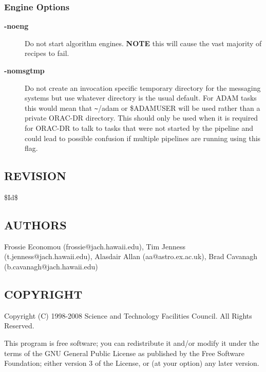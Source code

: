 \documentclass[twoside,11pt]{article}
\renewcommand{\_}{\texttt{\symbol{95}}}
\begin{document}
\subsubsection*{Engine Options\label{oracdr_Engine_Options}}
\begin{description}

\item[{\textbf{-noeng}}] \mbox{}

Do not start algorithm engines. \textbf{NOTE} this will cause
the vast majority of recipes to fail.


\item[{\textbf{-nomsgtmp}}] \mbox{}

Do not create an invocation specific temporary directory for the
messaging systems but use whatever directory is the usual default. For
ADAM tasks this would mean that \texttt{\~{}}/adam or \$ADAM\_USER will be used
rather than a private ORAC-DR directory. This should only be used when
it is required for ORAC-DR to talk to tasks that were not started by
the pipeline and could lead to possible confusion if multiple
pipelines are running using this flag.

\end{description}
\subsection*{REVISION\label{oracdr_REVISION}}


\$Id\$

\subsection*{AUTHORS\label{oracdr_AUTHORS}}


Frossie Economou (frossie@jach.hawaii.edu),
Tim Jenness (t.jenness@jach.hawaii.edu),
Alasdair Allan (aa@astro.ex.ac.uk),
Brad Cavanagh (b.cavanagh@jach.hawaii.edu)

\subsection*{COPYRIGHT\label{oracdr_COPYRIGHT}}


Copyright (C) 1998-2008 Science and Technology Facilities Council.
All Rights Reserved.



This program is free software; you can redistribute it and/or modify it under
the terms of the GNU General Public License as published by the Free Software
Foundation; either version 3 of the License, or (at your option) any later
version.
\end{document}
